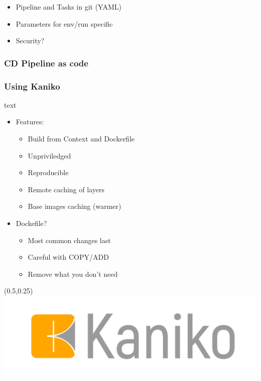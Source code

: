 \documentclass[aspectratio=169,11pt,hyperref={colorlinks=true}]{beamer}
\begin{document}
\begin{lblackrwhiteframe}
\begin{blackframe}
\begin{2columnsframe}
  {
  \begin{itemize}
    \item Pipeline and Tasks in git (YAML)
    \item Parameters for env/run specific
    \item Security?
  \end{itemize}
  \vspace{3ex}
  
  }
  {
  
  \vspace{1ex}
  
  }
  \frametitle{CD Pipeline as code}
\end{2columnsframe}

\begin{lblackrwhiteframe}
  \frametitle{Using Kaniko}
  \large
  \begin{beamercolorbox}[wd=0.45\paperwidth]{text}
    \begin{itemize}
      \item Features:
      \begin{itemize}
        \item Build from Context and Dockerfile
        \item Unpriviledged
        \item Reproducible
        \item Remote caching of layers
        \item Base images caching (warmer)
      \end{itemize}
    \end{itemize}
    \vspace{3ex}
    \begin{itemize}
      \item Dockefile?
      \begin{itemize}
        \item Most common changes last
        \item Careful with COPY/ADD
        \item Remove what you don't need
      \end{itemize}
    \end{itemize}
  \end{beamercolorbox}%
  \begin{textblock*}{0.5\paperwidth}(0.5\paperwidth,0.25\paperheight)
    \centering
    \includegraphics[width=0.35\paperwidth]{img/Kaniko-Logo.png}
  \end{textblock*}
\end{lblackrwhiteframe}


\end{blackframe}
\end{lblackrwhiteframe}
\end{document}

